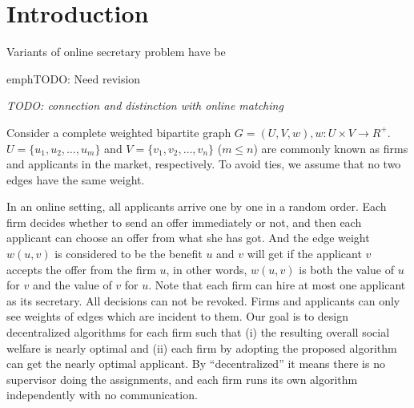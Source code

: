 \chapter{Introduction}

Variants of online secretary problem have be

emph{TODO: Need revision}

\emph{TODO: connection and distinction with online matching}

Consider a complete weighted bipartite graph
$G = (U, V, w), w: U \times V \rightarrow R^{+}$.
$U = \{u_1, u_2, \dots, u_m\}$ and $V = \{v_1, v_2, \dots, v_n\}$ ($m \le n$)
are commonly known as firms and applicants in the market, respectively.
To avoid ties, we assume that no two edges have the same weight.

In an online setting, all applicants arrive one by one
in a random order.
Each firm decides whether to send an offer immediately or not,
and then each applicant can choose an offer from what she has got.
And the edge weight $w(u,v)$ is considered to be the benefit $u$ and $v$ will get
if the applicant $v$ accepts the offer from the firm $u$, in other words, $w(u,v)$ is both the value of $u$ for $v$ and the value of $v$ for $u$.
Note that each firm can hire at most one applicant as its secretary.
All decisions can not be revoked.
Firms and applicants can only see weights of edges which are
incident to them.
Our goal is to design decentralized algorithms for each firm such that (i) the resulting overall social welfare is nearly optimal and (ii) each firm by adopting the proposed algorithm can get the nearly optimal applicant.
By ``decentralized'' it means there is no supervisor doing the
assignments, and each firm runs its own algorithm independently with no
communication.
